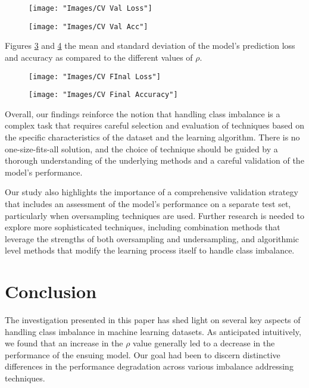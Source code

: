 \documentclass[journal]{IEEEtran}
\begin{document}
	
\begin{figure}
	\centering
	\texttt{[image: "Images/CV Val Loss"]}
	\caption{}
	\label{fig:cv-val-loss}
\end{figure}
	
	
\begin{figure}
	\centering
	\texttt{[image: "Images/CV Val Acc"]}
	\caption{}
	\label{fig:cv-val-acc}
\end{figure}
	
	Figures \ref{fig:cv-final-loss} and \ref{fig:cv-final-accuracy} the mean and standard deviation of the model's prediction loss and accuracy
	as compared to the different values of $\rho$.
		
	
\begin{figure}
	\centering
	\texttt{[image: "Images/CV FInal Loss"]}
	\caption{}
	\label{fig:cv-final-loss}
\end{figure}

\begin{figure}
	\centering
	\texttt{[image: "Images/CV Final Accuracy"]}
	\caption{}
	\label{fig:cv-final-accuracy}
\end{figure}
	
	Overall, our findings reinforce the notion that handling class imbalance is a complex task that requires careful selection and evaluation of techniques based on the specific characteristics of the dataset and the learning algorithm. There is no one-size-fits-all solution, and the choice of technique should be guided by a thorough understanding of the underlying methods and a careful validation of the model's performance.
	
	Our study also highlights the importance of a comprehensive validation strategy that includes an assessment of the model's performance on a separate test set, particularly when oversampling techniques are used. Further research is needed to explore more sophisticated techniques, including combination methods that leverage the strengths of both oversampling and undersampling, and algorithmic level methods that modify the learning process itself to handle class imbalance.
	
	
	
	\section{Conclusion}
	\label{sec:conclusion}
	
	The investigation presented in this paper has shed light on several key aspects of handling class imbalance in machine learning datasets. As anticipated intuitively, we found that an increase in the $\rho$ value generally led to a decrease in the performance of the ensuing model. Our goal had been to discern distinctive differences in the performance degradation across various imbalance addressing techniques.
	
\end{document}
